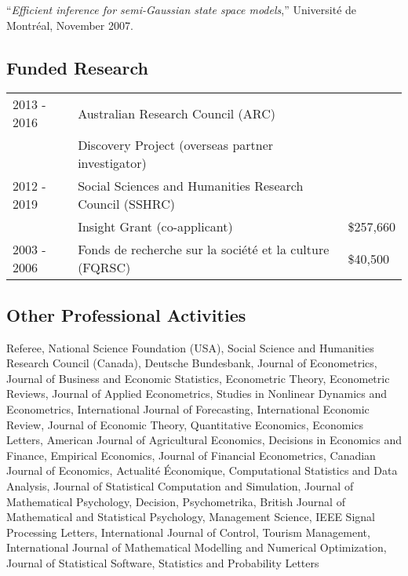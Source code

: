 \documentclass[12pt]{article}
\begin{document}
``{\it Efficient inference for semi-Gaussian state space models},''
Universit\'e de Montr\'eal, November 2007.







\subsection*{Funded Research}

\begin{tabular}{lll}
2013 - 2016
& Australian Research Council (ARC) \\
& Discovery Project (overseas partner investigator) \\
2012 - 2019
& Social Sciences and Humanities Research Council (SSHRC) \\
& Insight Grant (co-applicant)
& \$257,660 \\
2003 - 2006
& Fonds de recherche sur la soci\'et\'e et la culture (FQRSC)
& \$40,500 \\
\end{tabular}

\subsection*{Other Professional Activities}

Referee,
National Science Foundation (USA),
Social Science and Humanities Research Council (Canada),
Deutsche Bundesbank,
Journal of Econometrics,
Journal of Business and Economic Statistics,
Econometric Theory,
Econometric Reviews,
Journal of Applied Econometrics,
Studies in Nonlinear Dynamics and Econometrics,
International Journal of Forecasting,
International Economic Review,
Journal of Economic Theory,
Quantitative Economics,
Economics Letters,
American Journal of Agricultural Economics,
Decisions in Economics and Finance,
Empirical Economics,
Journal of Financial Econometrics,
Canadian Journal of Economics,
Actualit\'e \'Economique,
Computational Statistics and Data Analysis,
Journal of Statistical Computation and Simulation,
Journal of Mathematical Psychology,
Decision,
Psychometrika,
British Journal of Mathematical and Statistical Psychology,
Management Science,
IEEE Signal Processing Letters,
International Journal of Control,
Tourism Management,
International Journal of Mathematical Modelling and Numerical Optimization,
Journal of Statistical Software,
Statistics and Probability Letters
\end{document}

